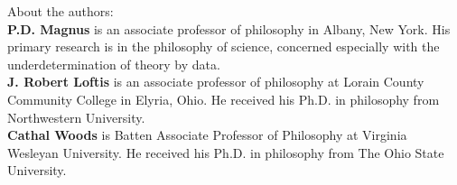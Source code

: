 \thispagestyle{empty}






\parbox{3 in}{
{\sf About the authors:}\\


\textbf{P.D. Magnus} is an associate professor of philosophy in Albany, New York. His primary research is in the philosophy of science, concerned especially with the underdetermination of theory by data.\\

\textbf{J. Robert Loftis} is an associate professor of philosophy at Lorain County Community College in Elyria, Ohio. He received his Ph.D. in philosophy from Northwestern University. \\

\textbf{Cathal Woods} is Batten Associate Professor of Philosophy at Virginia Wesleyan University. He received his Ph.D. in philosophy from The Ohio State University.

}
\vfill

